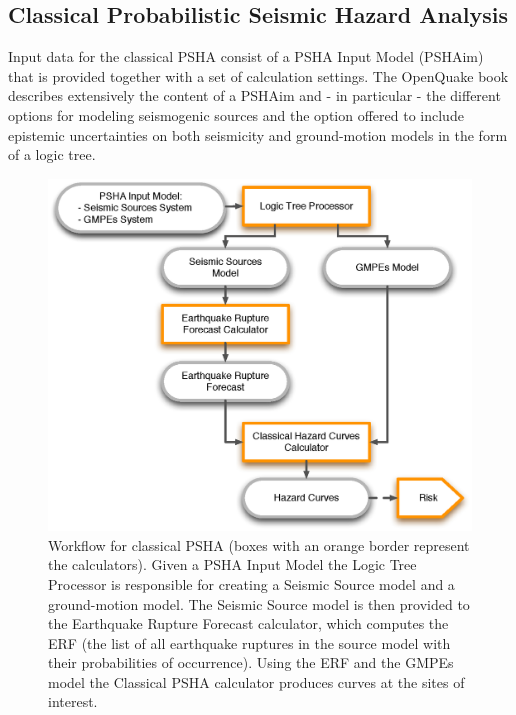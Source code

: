 \subsection{Classical Probabilistic Seismic Hazard Analysis}
\label{section:classicalPSHA}
%
Input data for the classical PSHA consist of a PSHA Input Model (PSHAim) that 
is provided together with a set of calculation settings. 
%
The OpenQuake book \citep{crowley2011} describes extensively the content of 
a PSHAim and - in particular - the different options for modeling 
seismogenic sources and the option offered to include epistemic uncertainties 
on both seismicity and ground-motion models in the form of a logic tree.
%
\begin{figure}[htbp]
\begin{center}
\includegraphics[width=14cm]{./figures/classical_psha_workflow.eps}
\caption{Workflow for classical PSHA (boxes with an orange border represent the 
calculators). Given a PSHA Input Model 
the Logic Tree Processor is responsible for creating a Seismic Source model
and a ground-motion model. 
The Seismic Source model is then provided to the Earthquake Rupture Forecast 
calculator, which computes the ERF (the list of all earthquake ruptures in the 
source model with their probabilities of occurrence). 
Using the ERF and the GMPEs model the Classical PSHA calculator produces 
curves at the sites of interest.}
\label{classical_psha_workflow}
\end{center}
\end{figure}

